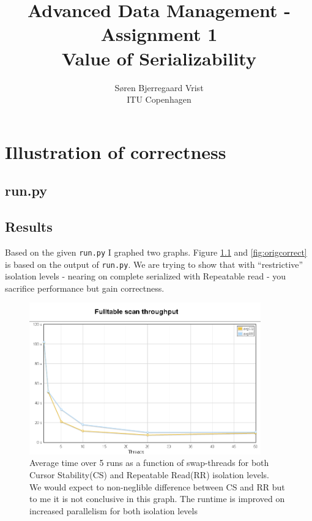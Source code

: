 
\title{Advanced Data Management - Assignment 1\\Value of Serializability}
\author{S\o ren Bjerregaard Vrist\\ITU Copenhagen}


\maketitle

\chapter{Illustration of correctness}

\section{run.py}

\section{Results}
Based on the given \verb|run.py| I graphed two graphs. Figure
\ref{fig:origtime} and \ref{fig:origcorrect} is based on the output of
\verb|run.py|. We are trying to show that with ``restrictive'' isolation levels
- nearing on complete serialized with Repeatable read - you sacrifice
performance but gain correctness.
\begin{figure}
  \centering
  \includegraphics[width=10cm]{origtime}
  \caption[Average time over 5 runs]{Average time over 5 runs as a function of
  swap-threads for both Cursor Stability(CS) and Repeatable Read(RR) isolation levels.\\
  We would expect to non-neglible difference between CS and RR but to me it is
  not conclusive in this graph. The runtime is improved on increased parallelism
  for both isolation levels}\label{fig:origtime}
\end{figure}

